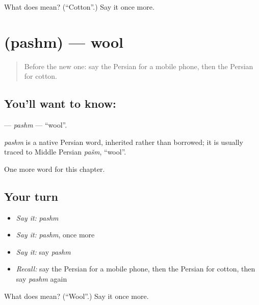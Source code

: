 \begin{tcolorbox}[breakable,colback=teal!4,colframe=teal!35!black,title={Before you move on}]
What does  mean? (\textquotedblleft{}Cotton\textquotedblright{}.) Say it once more.
\end{tcolorbox}
\section[\texorpdfstring{\fa{پشم} (pashm)}{پشم (pashm)}]{ (pashm) — wool}

\label{lesson:FA-C211-pashm}



\begin{quote}
Before the new one: say the Persian for a mobile phone, then the Persian for cotton.
\end{quote}

\subsection*{You'll want to know: }
\textbf{} — \emph{pashm} — \textquotedblleft{}wool\textquotedblright{}.

\begin{cousinweb}
\emph{pashm} is a native Persian word, inherited rather than borrowed; it is usually traced to Middle Persian \emph{pašm}, \textquotedblleft{}wool\textquotedblright{}.
\end{cousinweb}

\begin{grammarlens}[title={What you've built}]
One more word for this chapter.
\end{grammarlens}

\subsection*{Your turn}
\begin{itemize}
\raggedright
  \item \emph{Say it:} \emph{pashm}
  \item \emph{Say it:} \emph{pashm}, once more
  \item \emph{Say it:} say \emph{pashm}
  \item \emph{Recall:} say the Persian for a mobile phone, then the Persian for cotton, then say \emph{pashm} again
\end{itemize}

\begin{tcolorbox}[breakable,colback=teal!4,colframe=teal!35!black,title={Before you move on}]
What does  mean? (\textquotedblleft{}Wool\textquotedblright{}.) Say it once more.
\end{tcolorbox}
